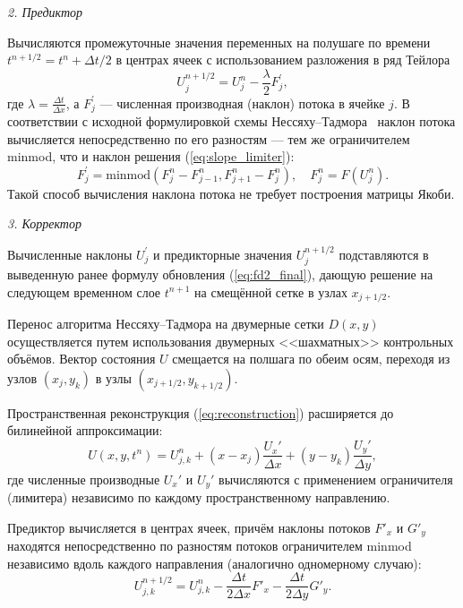 \documentclass[a4paper,14pt]{extarticle}
\theoremstyle{theorem}
\theoremstyle{lemma}
\begin{document}
\textit{2. Предиктор} 

Вычисляются промежуточные значения переменных на полушаге по времени $t^{n+1/2} = t^n + \Delta t / 2$ в центрах ячеек с использованием разложения в ряд Тейлора
\begin{equation}
\label{eq:predictor}
U_j^{n+1/2} = U_j^n - \frac{\lambda}{2} F_j^\prime,
\end{equation}
где $\lambda = \frac{\Delta t}{\Delta x}$, а $F_j^\prime$ — численная производная (наклон) потока в ячейке $j$. В соответствии с исходной формулировкой схемы Нессяху--Тадмора~\cite{nessyahu1990} наклон потока вычисляется непосредственно по его разностям --- тем же ограничителем minmod, что и наклон решения (\ref{eq:slope_limiter}):
\begin{equation}
    F_j^\prime = \text{minmod} \left( F_j^n - F_{j-1}^n, F_{j+1}^n - F_j^n \right), \quad F_j^n = F(U_j^n).
\end{equation}
Такой способ вычисления наклона потока не требует построения матрицы Якоби.

\textit{3. Корректор} 

Вычисленные наклоны $U_j^\prime$ и предикторные значения $U_j^{n+1/2}$ подставляются в выведенную ранее формулу обновления (\ref{eq:fd2_final}), дающую решение на следующем временном слое $t^{n+1}$ на смещённой сетке в узлах $x_{j+1/2}$.

Перенос алгоритма Нессяху--Тадмора на двумерные сетки $D(x, y)$ осуществляется путем использования двумерных <<шахматных>> контрольных объёмов. Вектор состояния $U$ смещается на полшага по обеим осям, переходя из узлов $(x_j, y_k)$ в узлы $(x_{j+1/2}, y_{k+1/2})$.

Пространственная реконструкция (\ref{eq:reconstruction}) расширяется до билинейной аппроксимации:
\begin{equation}
\label{eq:reconstruction_2d}
U(x, y, t^n) = U_{j,k}^n + (x - x_j) \frac{U_x'}{\Delta x} + (y - y_k) \frac{U_y'}{\Delta y},
\end{equation}
где численные производные $U_x'$ и $U_y'$ вычисляются с применением ограничителя (лимитера) независимо по каждому пространственному направлению.

Предиктор вычисляется в центрах ячеек, причём наклоны потоков $F'_x$ и $G'_y$ находятся непосредственно по разностям потоков ограничителем minmod независимо вдоль каждого направления (аналогично одномерному случаю):
\begin{equation}
\label{eq:predictor_2d}
U_{j,k}^{n+1/2} = U_{j,k}^n - \frac{\Delta t}{2\Delta x} F'_x - \frac{\Delta t}{2\Delta y} G'_y.
\end{equation}
\end{document}
